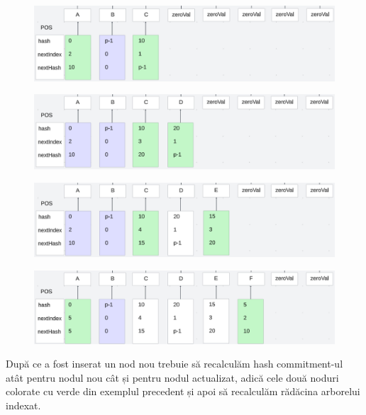 \documentclass[12pt, letterpaper]{article}
\begin{document}
\begin{figure}[ht]
    \includegraphics[width=1\textwidth]{images/nullTreeInsert/nullTreeInsert10.png}
    \label{fig:nullTreeInsert10}
\end{figure}

\begin{figure}[ht]
    \includegraphics[width=1\textwidth]{images/nullTreeInsert/nullTreeInsert20.png}
    \label{fig:nullTreeInsert20}
\end{figure}

\begin{figure}[ht]
    \includegraphics[width=1\textwidth]{images/nullTreeInsert/nullTreeInsert15.png}
    \label{fig:nullTreeInsert15}
\end{figure}

\begin{figure}[ht]
    \includegraphics[width=1\textwidth]{images/nullTreeInsert/nullTreeInsert5.png}
    \label{fig:nullTreeInsert5}
\end{figure}

\newpage

După ce a fost inserat un nod nou trebuie să recalculăm hash commitment-ul atât pentru nodul nou cât și pentru nodul actualizat, adică cele două noduri colorate cu verde din exemplul precedent și apoi să recalculăm rădăcina arborelui indexat.
\printbibliography
\end{document}
